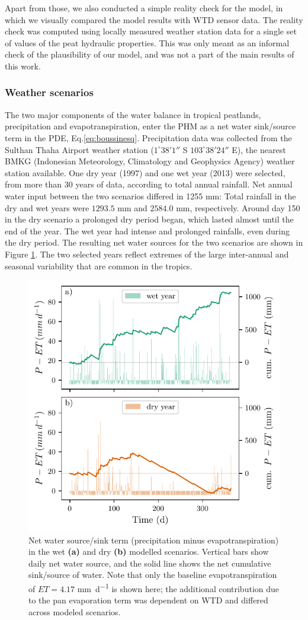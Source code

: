 \documentclass[bg, manuscript]{copernicus}
\begin{document}
Apart from those, we also conducted a simple reality check for the model, in which we visually compared the model results with WTD sensor data.
The reality check was computed using locally measured weather station data for a single set of values of the peat  hydraulic properties.
This was only meant as an informal check of the  plausibility of our model, and was not a part of the main results of this work.


\subsubsection{Weather scenarios}
The two major components of the water balance in tropical peatlands, precipitation and evapotranspiration, enter the PHM as a net water sink/source term in the PDE, Eq.\eqref{eq:boussinesq}.
Precipitation data was collected from the Sulthan Thaha Airport weather station ($1^\circ 38' 1''$ S $103^\circ 38' 24''$ E), the nearest BMKG (Indonesian Meteorology, Climatology and Geophysics Agency) weather station available.
One dry year (1997) and one wet year (2013) were selected, from more than 30 years of data, according to total annual rainfall.
Net annual water input between the two scenarios differed in 1255 \unit{mm}: Total rainfall in the dry and wet years were $1293.5$ \unit{mm} and $2584.0$ \unit{mm}, respectively.
Around day 150 in the dry scenario a prolonged dry period began, which lasted almost until the end of the year.
The wet year had intense and prolonged rainfalls, even during the dry period.
The resulting net water sources for the two scenarios are shown in Figure \ref{fig:p_minus_et}.
The two selected years  reflect extremes of the large inter-annual and seasonal variability that are common in the tropics.

\begin{figure}[t]
\includegraphics[width=8.3 cm]{figs/P_minus_ET.pdf}
\caption{Net water source/sink term (precipitation minus evapotranspiration) in the wet \textbf{(a)} and dry \textbf{(b)} modelled scenarios. Vertical bars show daily net water source, and the solid line shows the net cumulative sink/source of water.  Note that only the baseline evapotranspiration of $ET = 4.17$ \unit{mm d^{-1}} is shown here; the additional contribution due to the pan evaporation term was dependent on WTD and differed across modeled scenarios.}
\label{fig:p_minus_et}
\end{figure}   
\end{document}
